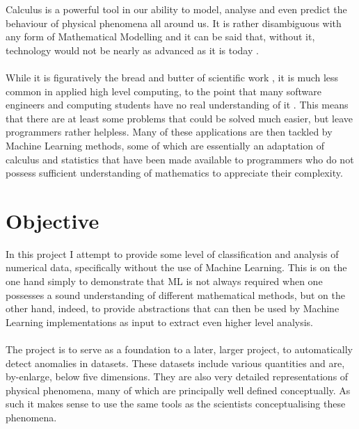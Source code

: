 \documentclass[main.tex]{subfiles}
\begin{document}
  
  Calculus is a powerful tool in our ability to model, analyse and even predict the behaviour of physical phenomena all around us. It is rather disambiguous with any form of Mathematical Modelling and it can be said that, without it, technology would not be nearly as advanced as it is today \cite{importtanceOfCalc}.
  \\\\
  While it is figuratively the bread and butter of scientific work \cite[Chapter~M1]{tipler}, it is much less common in applied high level computing, to the point that many software engineers and computing students have no real understanding of it \cite{programCalc1,programCalc2}. This means that there are at least some problems that could be solved much easier, but leave programmers rather helpless. Many of these applications are then tackled by Machine Learning methods, some of which are essentially an adaptation of calculus and statistics \cite[Page~5]{definitionML} that have been made available to programmers who do not possess sufficient understanding of mathematics to appreciate their complexity.

  \section{Objective}
    
    In this project I attempt to provide some level of classification and analysis of numerical data, specifically without the use of Machine Learning. This is on the one hand simply to demonstrate that ML is not always required when one possesses a sound understanding of different mathematical methods, but on the other hand, indeed, to provide abstractions that can then be used by Machine Learning implementations as input to extract even higher level analysis.
    \\\\
    The project is to serve as a foundation to a later, larger project, to automatically detect anomalies in datasets. These datasets include various quantities and are, by-enlarge, below five dimensions. They are also very detailed representations of physical phenomena, many of which are principally well defined conceptually. As such it makes sense to use the same tools as the scientists conceptualising these phenomena. 
    
\end{document}
